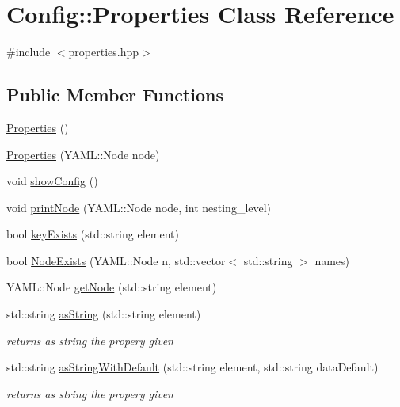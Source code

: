 \hypertarget{class_config_1_1_properties}{}\section{Config\+:\+:Properties Class Reference}
\label{class_config_1_1_properties}


{\ttfamily \#include $<$properties.\+hpp$>$}

\subsection*{Public Member Functions}
\begin{DoxyCompactItemize}
\item 
\hyperlink{class_config_1_1_properties_a86d9801a1b37443c70bd8985afe81a46}{Properties} ()
\item 
\hyperlink{class_config_1_1_properties_a78be1d1646141b99664c418744c6ec0d}{Properties} (Y\+A\+M\+L\+::\+Node node)
\item 
void \hyperlink{class_config_1_1_properties_a4c09553d96770e465f62a9899c94120d}{show\+Config} ()
\item 
void \hyperlink{class_config_1_1_properties_a04a44d109d5e9b34dd93b338e0754201}{print\+Node} (Y\+A\+M\+L\+::\+Node node, int nesting\+\_\+level)
\item 
bool \hyperlink{class_config_1_1_properties_a93e257f371ab1cd5d87d96fc39983101}{key\+Exists} (std\+::string element)
\item 
bool \hyperlink{class_config_1_1_properties_a8b47d362e0c7b5a8dce7b3efdbdb16b2}{Node\+Exists} (Y\+A\+M\+L\+::\+Node n, std\+::vector$<$ std\+::string $>$ names)
\item 
Y\+A\+M\+L\+::\+Node \hyperlink{class_config_1_1_properties_abb18930b0431bd89e85ed0a5b9b7cac3}{get\+Node} (std\+::string element)
\item 
std\+::string \hyperlink{class_config_1_1_properties_a87fb20ec94658e8ce0cce06b239019be}{as\+String} (std\+::string element)
\begin{DoxyCompactList}\small\item\em returns as string the propery given \end{DoxyCompactList}\item 
std\+::string \hyperlink{class_config_1_1_properties_a38019252713b2a815b78eab3a4e00e75}{as\+String\+With\+Default} (std\+::string element, std\+::string data\+Default)
\begin{DoxyCompactList}\small\item\em returns as string the propery given \end{DoxyCompactList}\item 

\end{DoxyCompactItemize}
